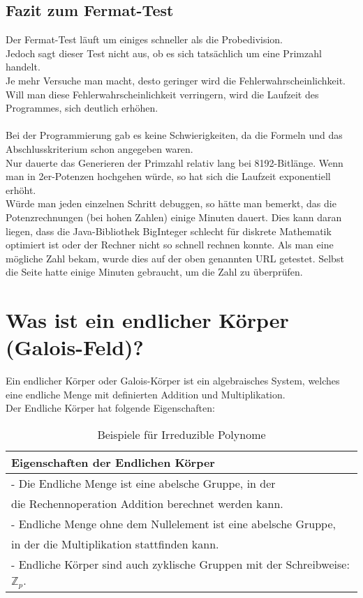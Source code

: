 \subsection*{Fazit zum Fermat-Test}

Der Fermat-Test läuft um einiges schneller als die Probedivision.\\
Jedoch sagt dieser Test nicht aus, ob es sich tatsächlich um eine Primzahl handelt.\\
Je mehr Versuche man macht, desto geringer wird die Fehlerwahrscheinlichkeit. \\
Will man diese Fehlerwahrscheinlichkeit verringern, wird die Laufzeit des Programmes, sich deutlich erhöhen.  \\
\\
Bei der Programmierung gab es keine Schwierigkeiten, da die Formeln und das Abschlusskriterium schon angegeben waren.\\
Nur dauerte das Generieren der Primzahl relativ lang bei 8192-Bitlänge. Wenn man in 2er-Potenzen hochgehen würde, so hat sich die Laufzeit exponentiell erhöht.\\
Würde man jeden einzelnen Schritt debuggen, so hätte man bemerkt, das die Potenzrechnungen (bei hohen Zahlen) einige Minuten dauert.
Dies kann daran liegen, dass die Java-Bibliothek BigInteger schlecht für diskrete Mathematik optimiert ist oder der Rechner nicht so schnell rechnen konnte.
Als man eine mögliche Zahl bekam, wurde dies auf der oben genannten URL getestet. Selbst die Seite hatte einige Minuten gebraucht, um die Zahl zu überprüfen.\\ 
\newpage
\section{Was ist ein endlicher Körper (Galois-Feld)?}

Ein endlicher Körper oder Galois-Körper ist ein algebraisches System, welches eine endliche Menge mit definierten Addition und Multiplikation.\\
Der Endliche Körper hat folgende Eigenschaften:


\begin{table}[!ht]
    \centering
        \begin{tabular}{l}
            \toprule
            \textbf{Eigenschaften der Endlichen Körper}\\
            \midrule
            - Die Endliche Menge ist eine abelsche Gruppe, in der \\
            die Rechennoperation Addition berechnet werden kann.\\
            - Endliche Menge ohne dem Nullelement ist eine abelsche Gruppe, \\
            in der die Multiplikation stattfinden kann.\\
            - Endliche Körper sind auch zyklische Gruppen mit der Schreibweise: $ \mathbb{Z}_p $. \\
           \bottomrule
        \end{tabular}
        \caption{Beispiele für Irreduzible Polynome}
        \label{tab3}
    \end{table}

